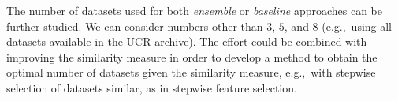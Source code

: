\documentclass[a4paper,11pt,twoside]{report}
\theoremstyle{definition}
\begin{document}
The number of datasets used for both \textit{ensemble} or \textit{baseline} approaches can be further studied. We can consider numbers other than $3$, $5$, and $8$ (e.g.,~using all datasets available in the UCR archive). The effort could be combined with improving the similarity measure in order to develop a method to obtain the optimal number of datasets given the similarity measure, e.g.,~with stepwise selection of datasets similar, as in stepwise feature selection.





\


\thispagestyle{empty}



%
%
%
%
%
%
\end{document}
